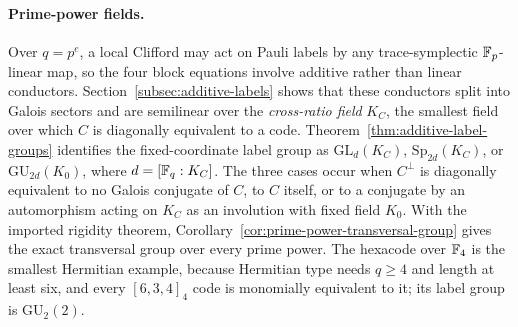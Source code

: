 \paragraph{Prime-power fields.}
Over \(q=p^e\), a local Clifford may act on Pauli labels by any
trace-symplectic \(\mathbb F_p\)-linear map, so the four block equations involve
additive rather than linear conductors.  Section~\ref{subsec:additive-labels}
shows that these conductors split into Galois sectors and are semilinear over
the \emph{cross-ratio field} \(K_C\), the smallest field over which \(C\) is
diagonally equivalent to a code.  Theorem~\ref{thm:additive-label-groups}
identifies the fixed-coordinate label group as \(\mathrm{GL}_d(K_C)\),
\(\mathrm{Sp}_{2d}(K_C)\), or \(\mathrm{GU}_{2d}(K_0)\), where
\(d=[\mathbb F_q:K_C]\).  The three cases occur when \(C^\perp\) is diagonally
equivalent to no Galois conjugate of \(C\), to \(C\) itself, or to a
conjugate by an automorphism acting on \(K_C\) as an involution with fixed
field \(K_0\).  With the imported rigidity theorem,
Corollary~\ref{cor:prime-power-transversal-group} gives the exact
transversal group over every prime power.  The hexacode over \(\mathbb F_4\) is the
smallest Hermitian example, because Hermitian type needs \(q\geq4\) and
length at least six, and every \([6,3,4]_4\) code is monomially equivalent
to it; its label group is \(\mathrm{GU}_2(2)\).

